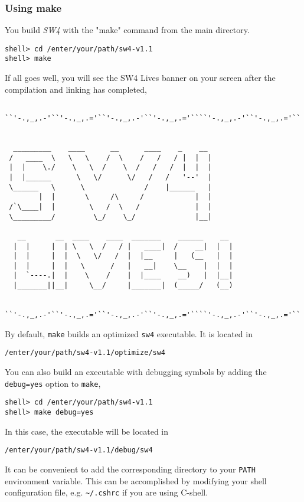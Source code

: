 \documentclass[11pt]{article}
\begin{document}
\subsubsection{Using make}
You build \emph{SW4} with the "make" command from the main directory.
\begin{verbatim}
shell> cd /enter/your/path/sw4-v1.1
shell> make
\end{verbatim}
If all goes well, you will see the SW4 Lives banner on your screen after the compilation and linking
has completed,
{\samepage
\begin{verbatim}
    
``'-.,_,.-'``'-.,_,.='``'-.,_,.-'``'-.,_,.='````'-.,_,.-'``'-.,_,.='``


  _________    ____      __      ____    _    __
 /   ____  \   \   \    /  \    /   /   / |  |  |  
 |  |    \./    \   \  /    \  /   /   /  |  |  |
 |  |______      \   \/      \/   /   /   '--'  |
 \______   \      \              /    |______   |
        |  |       \     /\     /            |  |      
 /`\____|  |        \   /  \   /             |  |      
 \_________/         \_/    \_/              |__|      
                                       
   __       __  ____    ____  _______    ______    __  
  |  |     |  | \   \  /   / |   ____|  /    __|  |  | 
  |  |     |  |  \   \/   /  |  |__     |   (__   |  | 
  |  |     |  |   \      /   |   __|    \__    |  |  | 
  |  `----.|  |    \    /    |  |____    __)   |  |__| 
  |_______||__|     \__/     |_______|  (_____/   (__)
     

``'-.,_,.-'``'-.,_,.='``'-.,_,.-'``'-.,_,.='````'-.,_,.-'``'-.,_,.='``

\end{verbatim}
}
By default, \verb+make+ builds an optimized \verb+sw4+ executable. It is located in 
\begin{verbatim}
/enter/your/path/sw4-v1.1/optimize/sw4
\end{verbatim}
You can also build an executable with debugging symbols by adding the \verb+debug=yes+ option to \verb+make+,
\begin{verbatim}
shell> cd /enter/your/path/sw4-v1.1
shell> make debug=yes
\end{verbatim}
In this case, the executable will be located in
\begin{verbatim}
/enter/your/path/sw4-v1.1/debug/sw4
\end{verbatim}
It can be convenient to add the corresponding directory to your \verb+PATH+ environment
variable. This can be accomplished by modifying your shell configuration file, e.g. \verb+~/.cshrc+
if you are using C-shell.
\end{document}
